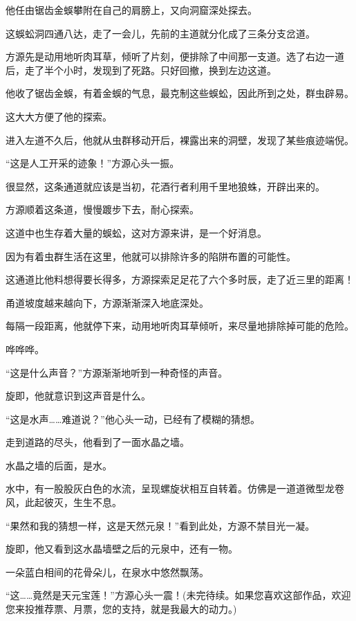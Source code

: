 \begin{this_body}
他任由锯齿金蜈攀附在自己的肩膀上，又向洞窟深处探去。

这蜈蚣洞四通八达，走了一会儿，先前的主道就分化成了三条分支岔道。

方源先是动用地听肉耳草，倾听了片刻，便排除了中间那一支道。选了右边一道后，走了半个小时，发现到了死路。只好回撤，换到左边这道。

他收了锯齿金蜈，有着金蜈的气息，最克制这些蜈蚣，因此所到之处，群虫辟易。

这大大方便了他的探索。

进入左道不久后，他就从虫群移动开后，裸露出来的洞壁，发现了某些痕迹端倪。

“这是人工开采的迹象！”方源心头一振。

很显然，这条通道就应该是当初，花酒行者利用千里地狼蛛，开辟出来的。

方源顺着这条道，慢慢踱步下去，耐心探索。

这道中也生存着大量的蜈蚣，这对方源来讲，是一个好消息。

因为有着虫群生活在这里，他就可以排除许多的陷阱布置的可能性。

这通道比他料想得要长得多，方源探索足足花了六个多时辰，走了近三里的距离！

甬道坡度越来越向下，方源渐渐深入地底深处。

每隔一段距离，他就停下来，动用地听肉耳草倾听，来尽量地排除掉可能的危险。

哗哗哗。

“这是什么声音？”方源渐渐地听到一种奇怪的声音。

旋即，他就意识到这声音是什么。

“这是水声……难道说？”他心头一动，已经有了模糊的猜想。

走到道路的尽头，他看到了一面水晶之墙。

水晶之墙的后面，是水。

水中，有一股股灰白色的水流，呈现螺旋状相互自转着。仿佛是一道道微型龙卷风，此起彼灭，生生不息。

“果然和我的猜想一样，这是天然元泉！”看到此处，方源不禁目光一凝。

旋即，他又看到这水晶墙壁之后的元泉中，还有一物。

一朵蓝白相间的花骨朵儿，在泉水中悠然飘荡。

“这……竟然是天元宝莲！”方源心头一震！(未完待续。如果您喜欢这部作品，欢迎您来投推荐票、月票，您的支持，就是我最大的动力。)

\end{this_body}

